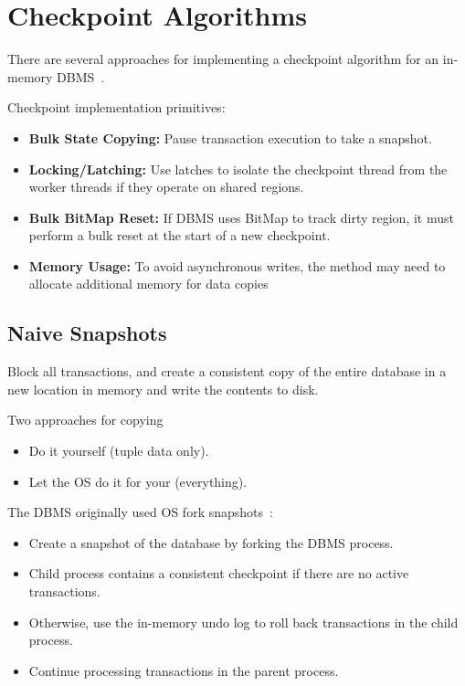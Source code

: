 \documentclass[11pt]{article}
\begin{document}
\section{Checkpoint Algorithms}
There are several approaches for implementing a checkpoint algorithm for an in-memory 
DBMS~\cite{p265-cao}.

Checkpoint implementation primitives:
\begin{itemize}
    \item \textbf{Bulk State Copying:}
    Pause transaction execution to take a snapshot.
    
    \item \textbf{Locking/Latching:}
    Use latches to isolate the checkpoint thread from the worker threads 
    if they operate on shared regions.
    
    \item \textbf{Bulk BitMap Reset:}
    If DBMS uses BitMap to track dirty region, it must perform a bulk reset at the start of a new 
    checkpoint.
    
    \item \textbf{Memory Usage:}
    To avoid asynchronous writes, the method may need to allocate 
    additional memory for data copies
\end{itemize}

\subsection{Naive Snapshots}
Block all transactions, and create a consistent copy of the entire database in a new 
location in memory and write the contents to disk.

Two approaches for copying
\begin{itemize}
    \item
    Do it yourself (tuple data only).
    
    \item
    Let the OS do it for your (everything).
\end{itemize}

The  DBMS originally used OS fork snapshots~\cite{p195-kemper}:
\begin{itemize}
    \item
    Create a snapshot of the database by forking the DBMS process.
    
    \item
    Child process contains a consistent checkpoint if there are no active transactions.
    
    \item
    Otherwise, use the in-memory undo log to roll back transactions in the child process.
    
    \item
    Continue processing transactions in the parent process.
\end{itemize}
\end{document}

